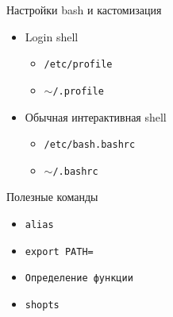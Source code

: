\documentclass[ignorenonframetext, professionalfonts, hyperref={unicode}]{beamer}
\begin{document}
\begin{frame}{Настройки bash и кастомизация}
  \begin{itemize}
    \item Login shell
      \begin{itemize}
        \item {\tt /etc/profile}
        \item {\tt $\sim$/.profile }
      \end{itemize}
    \item Обычная интерактивная shell
      \begin{itemize}
        \item {\tt /etc/bash.bashrc}
        \item {\tt $\sim$/.bashrc}
      \end{itemize}
  \end{itemize}

  Полезные команды
  \begin{itemize}
    \item {\tt alias}
    \item {\tt export PATH=}
    \item {\tt Определение функции}
    \item {\tt shopts}
  \end{itemize}

\end{frame}
\end{document}
